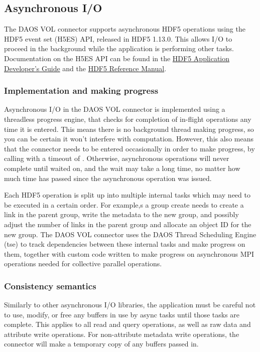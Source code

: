 \documentclass[../users_guide.tex]{subfiles}
\begin{document}
\subsection{Asynchronous I/O}

The DAOS VOL connector supports asynchronous HDF5 operations using the HDF5
event set (H5ES) API, released in HDF5 1.13.0. This allows I/O to proceed in the
background while the application is performing other tasks. Documentation on the
H5ES API can be found in the
\href{https://portal.hdfgroup.org/display/HDF5/Asynchronous+operations+with+HDF5+VOL+connectors}{HDF5 Application Developer's Guide} and the
\href{https://portal.hdfgroup.org/display/HDF5/Event+Set}{HDF5 Reference Manual}.


\subsubsection{Implementation and making progress}

Asynchronous I/O in the DAOS VOL connector is implemented using a threadless
progress engine, that checks for completion of in-flight operations any time it
is entered. This means there is no background thread making progress, so you can
be certain it won't interfere with computation. However, this also means that
the connector needs to be entered occasionally in order to make progress, by
calling  with a timeout of . Otherwise,
asynchronous operations will never complete until waited on, and the wait may
take a long time, no matter how much time has passed since the asynchronous
operation was issued.

Each HDF5 operation is split up into multiple internal tasks which may need to
be executed in a certain order. For example,s a group create needs to create a
link in the parent group, write the metadata to the new group, and possibly
adjust the number of links in the parent group and allocate an object ID for the
new group. The DAOS VOL connector uses the DAOS Thread Scheduling Engine (tse)
to track dependencies between these internal tasks and make progress on them,
together with custom code written to make progress on asynchronous MPI
operations needed for collective parallel operations.

\subsubsection {Consistency semantics}

Similarly to other asynchronous I/O libraries, the application must be careful
not to use, modify, or free any buffers in use by async tasks until those tasks
are complete. This applies to all read and query operations, as well as raw data
and attribute write operations.  For non-attribute metadata write operations,
the connector will make a temporary copy of any buffers passed in.
\end{document}
